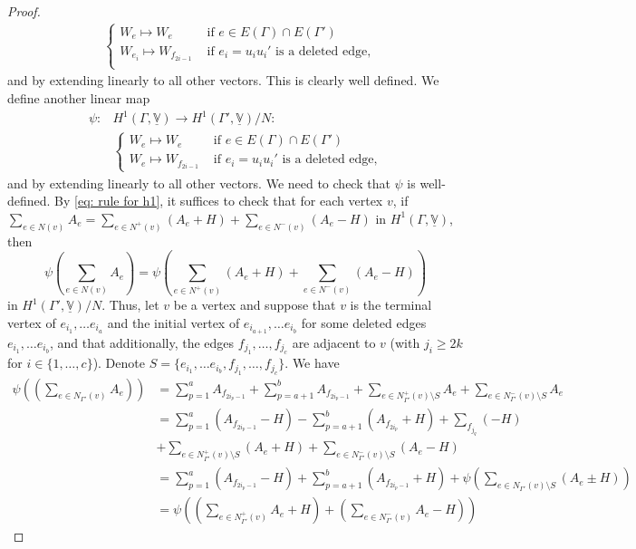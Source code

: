 \documentclass[10pt,a4paper]{amsart}
\begin{document}
\begin{proof}
\begin{equation*}
\begin{array}{cl}
   &\begin{cases}
    W_{e} \mapsto W_{e} &\text{ if $e\in E(\Gamma) \cap E(\Gamma') $}\\
   W_{e_i} \mapsto W_{f_{2i - 1}} &\text{ if $e_i=u_iu_{i}'$ is a deleted edge},\\
   \end{cases}
\end{array}
\end{equation*}
and by extending linearly to all other vectors. This is clearly well defined. We define another linear map
\begin{equation*}
\begin{array}{cl}
   \psi: &H^{1}(\Gamma, \underline{\mathbb{V}}) \rightarrow H^{1}(\Gamma', \underline{\mathbb{V}})/N:\\
   &\begin{cases}
    W_{e} \mapsto W_{e} &\text{ if $e \in E(\Gamma) \cap E(\Gamma')$}\\
    W_{e} \mapsto W_{f_{2i -1}} &\text{ if $e_i=u_iu_{i}'$ is a deleted edge,}
    \end{cases}
\end{array}
\end{equation*}
and by extending linearly to all other vectors.
We need to check that $\psi$ is well-defined. By \eqref{eq: rule for h1}, it suffices to check that for each vertex $v$, if $\sum_{e\in N(v)} A_{e} = \sum_{e\in N^{+}(v)} (A_{e} + H)+ \sum_{e\in N^{-}(v)} (A_{e} - H)$ in $H^{1}(\Gamma, \underline{\mathbb{V}})$, then
\begin{equation*}
    \psi \left(\sum_{e\in N(v)} A_{e}\right) = \psi\left( \sum_{e\in N^{+}(v)} (A_{e} + H)+ \sum_{e\in N^{-}(v)} (A_{e} - H)\right)
\end{equation*}
in $H^{1}(\Gamma', \underline{\mathbb{V}})/N$. 
Thus, let $v$ be a vertex and suppose that $v$ is the terminal vertex of $e_{i_1}, \dots e_{i_{a}}$ and the initial vertex of $e_{i_{a+1}}, \dots e_{i_{b}}$ for some deleted edges $e_{i_1}, \dots e_{i_b}$, and that additionally, the edges $f_{j_1}, \dots, f_{j_c}$ are adjacent to $v$ (with $j_i \geq 2k$ for $i\in \{1, \dots, c\}$). Denote $S= \{e_{i_1}, \dots e_{i_{b}}, f_{j_1},\dots, f_{j_c} \}$. 
We have
\begin{align*}
\psi(\left(\sum_{e\in N_{\Gamma'}(v)} A_{e}\right) ) &= \sum_{p = 1}^{a} A_{f_{2  i_{p} - 1}} + \sum_{p = a+1}^{b} A_{f_{2  i_{p} - 1}} + \sum_{e\in N_{\Gamma'}^{+}(v) \setminus S}  A_{e} + \sum_{e\in N_{\Gamma'}^{-}(v) \setminus S}  A_{e} \\
&= \sum_{p = 1}^{a} (A_{f_{2  i_{p} - 1}} - H) - \sum_{p = a+1}^{b} (A_{f_{2  i_{p}}} +H) + \sum_{f_{j_q}}( - H)\\
&+ \sum_{e\in N_{\Gamma'}^{+}(v) \setminus S}  (A_{e} + H)+ \sum_{e\in N_{\Gamma'}^{-}(v) \setminus S}  (A_{e} -H)\\
&= \sum_{p = 1}^{a} (A_{f_{2  i_{p} - 1}} - H) + \sum_{p = a+1}^{b} (A_{f_{2  i_{p} -1}} + H) + \psi(\sum_{e\in N_{\Gamma'}(v) \setminus S}  (A_{e} \pm H)) \\
&=  \psi\left( \left(\sum_{e\in N_{\Gamma'}^{+}(v)} A_{e} + H\right) + \left(\sum_{e\in N_{\Gamma'}^{-}(v)} A_{e} - H\right)\right)
\end{align*}


\end{proof}
\end{document}
